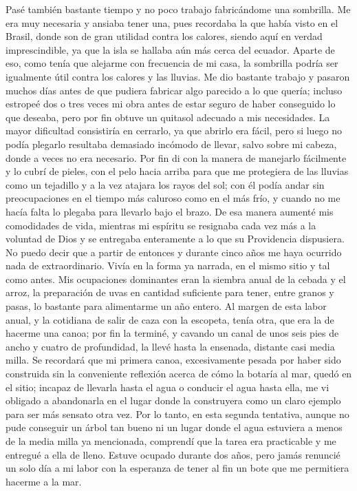 \documentclass{novela}
\begin{document}
    Pasé también bastante tiempo y no poco trabajo fabricándome una sombrilla. Me era muy necesaria y ansiaba tener una, pues recordaba la que había visto en el Brasil, donde son de gran utilidad contra los calores, siendo aquí en verdad imprescindible, ya que la isla se hallaba aún más cerca del ecuador. Aparte de eso, como tenía que alejarme con frecuencia de mi casa, la sombrilla podría ser igualmente útil contra los calores y las lluvias. Me dio bastante trabajo y pasaron muchos días antes de que pudiera fabricar algo parecido a lo que quería; incluso estropeé dos o tres veces mi obra antes de estar seguro de haber conseguido lo que deseaba, pero por fin obtuve un quitasol adecuado a mis necesidades. La mayor dificultad consistiría en cerrarlo, ya que abrirlo era fácil, pero si luego no podía plegarlo resultaba demasiado incómodo de llevar, salvo sobre mi cabeza, donde a veces no era necesario. Por fin di con la manera de manejarlo fácilmente y lo cubrí de pieles, con el pelo hacia arriba para que me protegiera de las lluvias como un tejadillo y a la vez atajara los rayos del sol; con él podía andar sin preocupaciones en el tiempo más caluroso como en el más frío, y cuando no me hacía falta lo plegaba para llevarlo bajo el brazo.
    De esa manera aumenté mis comodidades de vida, mientras mi espíritu se resignaba cada vez más a la voluntad de Dios y se entregaba enteramente a lo que su Providencia dispusiera.
    No puedo decir que a partir de entonces y durante cinco años me haya ocurrido nada de extraordinario. Vivía en la forma ya narrada, en el mismo sitio y tal como antes. Mis ocupaciones dominantes eran la siembra anual de la cebada y el arroz, la preparación de uvas en cantidad suficiente para tener, entre granos y pasas, lo bastante para alimentarme un año entero. Al margen de esta labor anual, y la cotidiana de salir de caza con la escopeta, tenía otra, que era la de hacerme una canoa; por fin la terminé, y cavando un canal de unos seis pies de ancho y cuatro de profundidad, la llevé hasta la ensenada, distante casi media milla. Se recordará que mi primera canoa, excesivamente pesada por haber sido construida sin la conveniente reflexión acerca de cómo la botaría al mar, quedó en el sitio; incapaz de llevarla hasta el agua o conducir el agua hasta ella, me vi obligado a abandonarla en el lugar donde la construyera como un claro ejemplo para ser más sensato otra vez. Por lo tanto, en esta segunda tentativa, aunque no pude conseguir un árbol tan bueno ni un lugar donde el agua estuviera a menos de la media milla ya mencionada, comprendí que la tarea era practicable y me entregué a ella de lleno. Estuve ocupado durante dos años, pero jamás renuncié un solo día a mi labor con la esperanza de tener al fin un bote que me permitiera hacerme a la mar.
\end{document}
